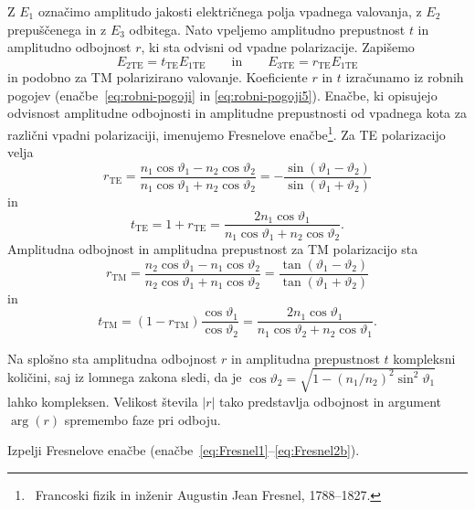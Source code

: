 Z $E_1$ označimo amplitudo jakosti električnega polja vpadnega valovanja, 
z $E_2$ prepuščenega in z $E_3$ odbitega.
Nato vpeljemo amplitudno prepustnost $t$ in amplitudno odbojnost $r$, 
ki sta odvisni od vpadne polarizacije. Zapišemo
\begin{equation}
E_{2\mathrm{TE}} =t_{\mathrm{TE}}E_{1\mathrm{TE}} \qquad \mathrm{in} \qquad 
E_{3\mathrm{TE}} =r_{\mathrm{TE}}E_{1\mathrm{TE}}
\end{equation}
in podobno za TM polarizirano valovanje. Koeficiente $r$ in $t$ izračunamo iz robnih pogojev (enačbe~\ref{eq:robni-pogoji} in \ref{eq:robni-pogoji5}). 
Enačbe, ki opisujejo odvisnost amplitudne odbojnosti
in amplitudne prepustnosti od vpadnega kota za različni vpadni polarizaciji, imenujemo
Fresnelove enačbe\footnote{~Francoski fizik in inženir 
Augustin Jean Fresnel, 1788--1827.}. Za TE polarizacijo velja
\begin{equation}
r_{\mathrm{TE}}=\frac{n_{1}\cos\vartheta_{1}-n_{2}\cos\vartheta_{2}}{n_{1}\cos\vartheta_{1}+
n_{2}\cos\vartheta_{2}} = -\frac{\sin(\vartheta_1-\vartheta_2)}{\sin(\vartheta_1+\vartheta_2)}
\label{eq:Fresnel1}
\end{equation}
in
\begin{equation}
t_{\mathrm{TE}}=1+r_{\mathrm{TE}}=\frac{2n_{1}\cos\vartheta_{1}}{n_{1}\cos\vartheta_{1}+
n_{2}\cos\vartheta_{2}}.
\end{equation}
Amplitudna odbojnost in amplitudna prepustnost za TM polarizacijo sta
\begin{equation}
r_{\mathrm{TM}}=\frac{n_{2}\cos\vartheta_{1}-n_{1}\cos\vartheta_{2}}{n_{2}\cos\vartheta_{1}+n_{1}\cos\vartheta_{2}} = \frac{\tan(\vartheta_1-\vartheta_2)}{\tan(\vartheta_1+\vartheta_2)}
\label{eq:Fresnel2}
\end{equation}
in
\begin{equation}
t_{\mathrm{TM}}=(1-r_{\mathrm{TM}})\frac{\cos\vartheta_{1}}{\cos\vartheta_{2}}=
\frac{2n_{1}\cos\vartheta_{1}}
{n_{1}\cos\vartheta_{2}+n_{2}\cos\vartheta_{1}}.
\label{eq:Fresnel2b}
\end{equation}

Na splošno sta amplitudna odbojnost $r$ in amplitudna prepustnost $t$ kompleksni
količini, saj iz lomnega zakona sledi, da je $\cos\vartheta_{2}=
\sqrt{1-\left(n_{1}/n_{2}\right)^{2}\sin^{2}\vartheta_{1}}$
lahko kompleksen. Velikost števila $\left|r\right|$ tako predstavlja
odbojnost in argument $\arg(r)$ spremembo faze
pri odboju.

\begin{definition}
Izpelji Fresnelove enačbe (enačbe~\ref{eq:Fresnel1}--\ref{eq:Fresnel2b}).
\end{definition}

